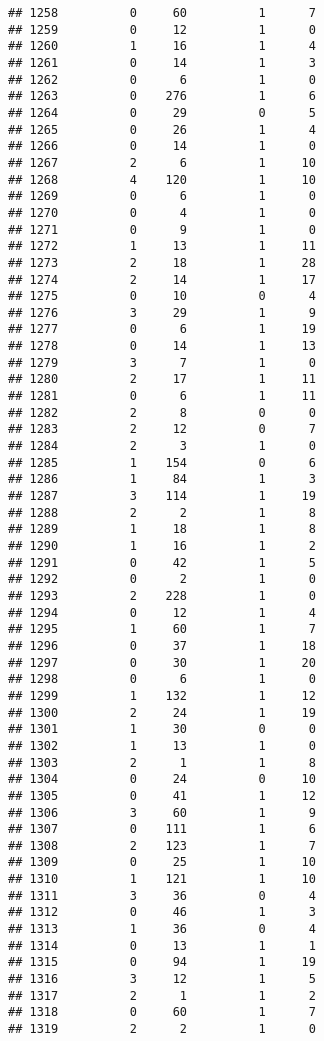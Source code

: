 \documentclass[]{article}
\begin{document}
\begin{verbatim}
## 1258          0     60          1      7
## 1259          0     12          1      0
## 1260          1     16          1      4
## 1261          0     14          1      3
## 1262          0      6          1      0
## 1263          0    276          1      6
## 1264          0     29          0      5
## 1265          0     26          1      4
## 1266          0     14          1      0
## 1267          2      6          1     10
## 1268          4    120          1     10
## 1269          0      6          1      0
## 1270          0      4          1      0
## 1271          0      9          1      0
## 1272          1     13          1     11
## 1273          2     18          1     28
## 1274          2     14          1     17
## 1275          0     10          0      4
## 1276          3     29          1      9
## 1277          0      6          1     19
## 1278          0     14          1     13
## 1279          3      7          1      0
## 1280          2     17          1     11
## 1281          0      6          1     11
## 1282          2      8          0      0
## 1283          2     12          0      7
## 1284          2      3          1      0
## 1285          1    154          0      6
## 1286          1     84          1      3
## 1287          3    114          1     19
## 1288          2      2          1      8
## 1289          1     18          1      8
## 1290          1     16          1      2
## 1291          0     42          1      5
## 1292          0      2          1      0
## 1293          2    228          1      0
## 1294          0     12          1      4
## 1295          1     60          1      7
## 1296          0     37          1     18
## 1297          0     30          1     20
## 1298          0      6          1      0
## 1299          1    132          1     12
## 1300          2     24          1     19
## 1301          1     30          0      0
## 1302          1     13          1      0
## 1303          2      1          1      8
## 1304          0     24          0     10
## 1305          0     41          1     12
## 1306          3     60          1      9
## 1307          0    111          1      6
## 1308          2    123          1      7
## 1309          0     25          1     10
## 1310          1    121          1     10
## 1311          3     36          0      4
## 1312          0     46          1      3
## 1313          1     36          0      4
## 1314          0     13          1      1
## 1315          0     94          1     19
## 1316          3     12          1      5
## 1317          2      1          1      2
## 1318          0     60          1      7
## 1319          2      2          1      0
\end{verbatim}
\end{document}

